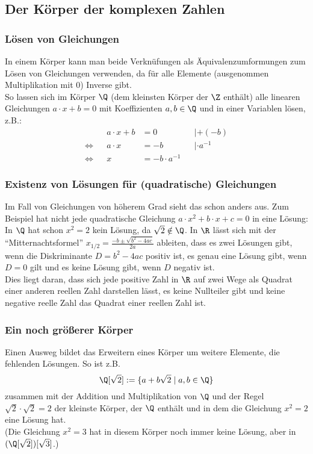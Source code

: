\subsection{Der Körper der komplexen Zahlen}
%
\begin{frame}\frametitle{Lösen von Gleichungen}
In einem Körper kann man beide Verknüfungen als Äquivalenzumformungen zum Lösen von Gleichungen verwenden, da für alle Elemente (ausgenommen Multiplikation mit $0$) Inverse gibt.\\\pause
\vfill
So lassen sich im Körper $\Q$ (dem kleinsten Körper der $\Z$ enthält) alle linearen Gleichungen $a\cdot x + b =0$ mit Koeffizienten $a,b \in \Q$ und in einer Variablen lösen, z.B.:\pause
\begin{align*}
&&a\cdot x + b &=0 &&| +(-b)\\
\Leftrightarrow &&a\cdot x &= -b &&| \cdot a^{-1}\\
\Leftrightarrow &&x&= -b \cdot a^{-1}&&
\end{align*} 
\end{frame}
%
\begin{frame}\frametitle{Existenz von Lösungen für (quadratische) Gleichungen}
Im Fall von Gleichungen von höherem Grad sieht das schon anders aus. Zum Beispiel hat nicht jede quadratische Gleichung $a\cdot x^2 +b\cdot x +c =0$ in eine Lösung:
\vfill
In $\Q$ hat schon $x^2=2$ kein Lösung, da $\sqrt{2} \notin \Q$.
\vfill \pause
In $\R$ lässt sich mit der ``Mitternachtsformel'' $x_{1/2} = \frac{-b \pm \sqrt{b^2-4ac}}{2a}$ ableiten, dass es zwei Lösungen gibt, wenn die Diskriminante $D=b^2-4ac$ positiv ist, es genau eine Lösung gibt, wenn $D=0$ gilt und es keine Lösung gibt, wenn $D$ negativ ist.\\
Dies liegt daran, dass sich jede positive Zahl in $\R$ auf zwei Wege als Quadrat einer anderen reellen Zahl darstellen lässt, es keine Nullteiler gibt und keine negative reelle Zahl das Quadrat einer reellen Zahl ist.

\end{frame}
%
\begin{frame}\frametitle{Ein noch größerer Körper}
Einen Ausweg bildet das Erweitern eines Körper um weitere Elemente, die fehlenden Lösungen. So ist z.B. 
$$
\Q[\sqrt{2}]:=\{a+b\sqrt{2} \mid a,b \in \Q\}
$$
zusammen mit der Addition und Multiplikation von $\Q$ und der Regel $\sqrt{2}\cdot \sqrt{2}=2$ der kleinste Körper, der $\Q$ enthält und in dem die Gleichung $x^2=2$ eine Lösung hat. \\\pause
\vfill
(Die Gleichung $x^2=3$ hat in diesem Körper noch immer keine Lösung, aber in $(\Q[\sqrt{2}])[\sqrt{3}]$.)
\end{frame}

